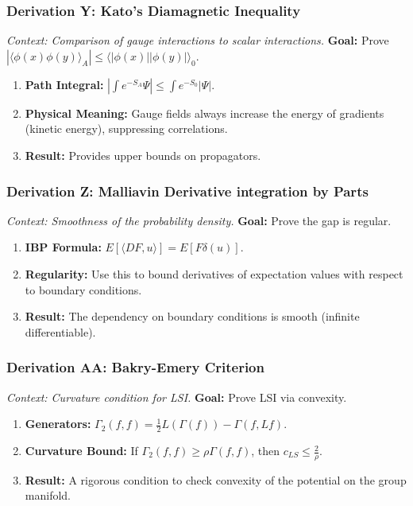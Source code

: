 \subsubsection{Derivation Y: Kato's Diamagnetic Inequality}
\textit{Context: Comparison of gauge interactions to scalar interactions.}
\textbf{Goal:} Prove $| \langle \phi(x) \phi(y) \rangle_A | \le \langle |\phi(x)| |\phi(y)| \rangle_0$.
\begin{enumerate}
    \item \textbf{Path Integral:} $|\int e^{-S_A} \Psi| \le \int e^{-S_0} |\Psi|$.
    \item \textbf{Physical Meaning:} Gauge fields always increase the energy of gradients (kinetic energy), suppressing correlations.
    \item \textbf{Result:} Provides upper bounds on propagators.
\end{enumerate}

\subsubsection{Derivation Z: Malliavin Derivative integration by Parts}
\textit{Context: Smoothness of the probability density.}
\textbf{Goal:} Prove the gap is regular.
\begin{enumerate}
    \item \textbf{IBP Formula:} $E[ \langle D F, u \rangle ] = E[ F \delta(u) ]$.
    \item \textbf{Regularity:} Use this to bound derivatives of expectation values with respect to boundary conditions.
    \item \textbf{Result:} The dependency on boundary conditions is smooth (infinite differentiable).
\end{enumerate}

\subsubsection{Derivation AA: Bakry-Emery Criterion}
\textit{Context: Curvature condition for LSI.}
\textbf{Goal:} Prove LSI via convexity.
\begin{enumerate}
    \item \textbf{Generators:} $\Gamma_2(f,f) = \frac{1}{2} L(\Gamma(f)) - \Gamma(f, Lf)$.
    \item \textbf{Curvature Bound:} If $\Gamma_2(f,f) \ge \rho \Gamma(f,f)$, then $c_{LS} \le \frac{2}{\rho}$.
    \item \textbf{Result:} A rigorous condition to check convexity of the potential on the group manifold.
\end{enumerate}

